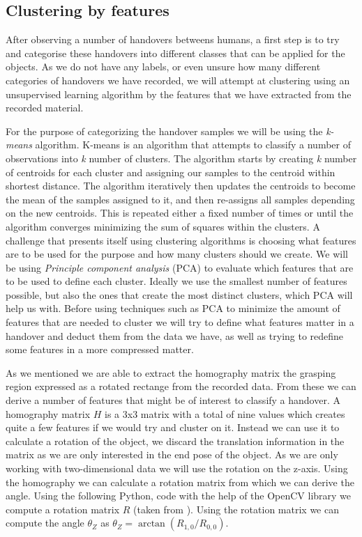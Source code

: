\subsection{Clustering by features}

After observing a number of handovers betweens humans, a first step is to try and categorise these handovers into different classes that can be applied for the objects. As we do not have any labels, or even unsure how many different categories of handovers we have recorded, we will attempt at clustering using an unsupervised learning algorithm by the features that we have extracted from the recorded material.

For the purpose of categorizing the handover samples we will be using the \emph{k-means} algorithm. K-means is an algorithm that attempts to classify a number of observations into \emph{k} number of clusters. The algorithm starts by creating \emph{k} number of centroids for each cluster and assigning our samples to the centroid within shortest distance. The algorithm iteratively then updates the centroids to become the mean of the samples assigned to it, and then re-assigns all samples depending on the new centroids. This is repeated either a fixed number of times or until the algorithm converges minimizing the sum of squares within the clusters. A challenge that presents itself using clustering algorithms is choosing what features are to be used for the purpose and how many clusters should we create. We will be using \emph{Principle component analysis} (PCA) to evaluate which features that are to be used to define each cluster. Ideally we use the smallest number of features possible, but also the ones that create the most distinct clusters, which PCA will help us with. Before using techniques such as PCA to minimize the amount of features that are needed to cluster we will try to define what features matter in a handover and deduct them from the data we have, as well as trying to redefine some features in a more compressed matter.

As we mentioned we are able to extract the homography matrix the grasping region expressed as a rotated rectange from the recorded data. From these we can derive a number of features that might be of interest to classify a handover. A homography matrix \(H\) is a 3x3 matrix with a total of nine values which creates quite a few features if we would try and cluster on it. Instead we can use it to calculate a rotation of the object, we discard the translation information in the matrix as we are only interested in the end pose of the object. As we are only working with two-dimensional data we will use the rotation on the z-axis. Using the homography we can calculate a rotation matrix from which we can derive the angle. Using the following Python, code with the help of the OpenCV library we compute a rotation matrix \(R\) (taken from \parencite{OpenCVHomographyDemo}). Using the rotation matrix we can compute the angle \(\theta_Z\) as \(\theta_Z = \arctan(R_{1,0} / R_{0,0})\).


